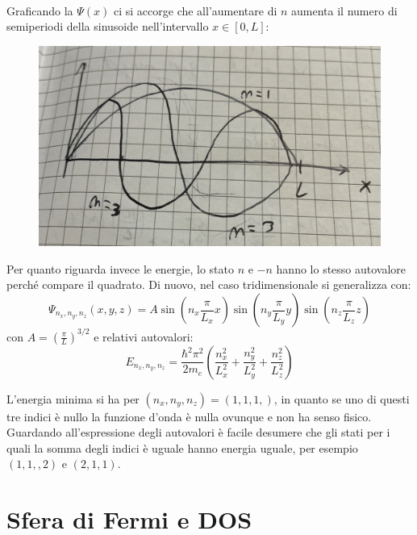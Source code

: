 \documentclass{book}
\begin{document}
            \paragraph{}
                Graficando la $\Psi(x)$ ci si accorge che all'aumentare di $n$ aumenta il numero di semiperiodi della sinusoide nell'intervallo $x \in [0, L]$:
                \begin{figure}[h!]
                    \centering
                    \includegraphics[width=0.5\linewidth]{img/intervalliSinLez12.png}           
                \end{figure}
                \newline
                Per quanto riguarda invece le energie, lo stato $n$ e $-n$ hanno lo stesso autovalore perché compare il quadrato. \newline
                Di nuovo, nel caso tridimensionale si generalizza con:
                $$\Psi_{n_{x}, n_{y}, n_{z}} (x,y,z) = A\sin(n_{x} \frac{\pi}{L_{x}} x)\sin(n_{y} \frac{\pi}{L_{y}} y)\sin(n_{z} \frac{\pi}{L_{z}} z)$$
                con $A= (\frac{\pi}{L})^{3/2}$
                e relativi autovalori:
                $$E_{n_{x},n_{y},n_{z}} = \frac{\hbar ^{2} \pi ^{2}}{2m_{e}} (\frac{n_{x} ^{2}}{L_{x} ^{2}}+\frac{n_{y} ^{2}}{L_{y} ^{2}}+\frac{n_{z} ^{2}}{L_{z} ^{2}})$$

                L'energia minima si ha per $(n_{x}, n_{y}, n_{z}) = (1,1,1,)$, in quanto se uno di questi tre indici è nullo la funzione d'onda è nulla ovunque e non ha senso fisico. Guardando all'espressione degli autovalori è facile desumere che gli stati per i quali la somma degli indici è uguale hanno energia uguale, per esempio $(1,1,,2)$ e $(2,1,1)$.

        \section{Sfera di Fermi e DOS}
\end{document}
